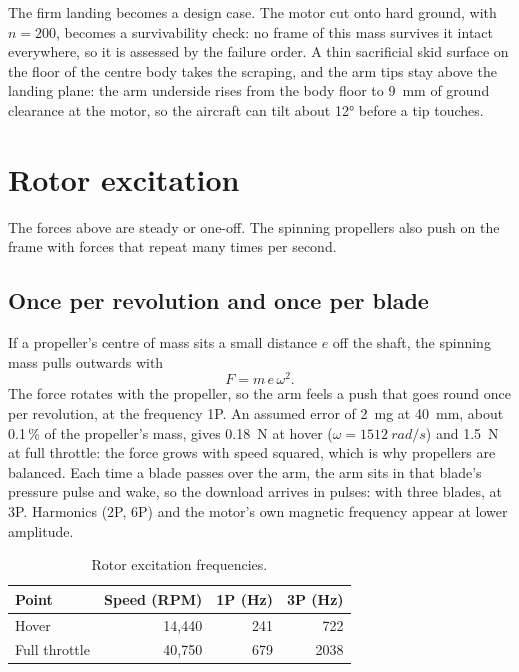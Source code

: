 The firm landing becomes a design case. The motor cut onto hard ground, with $n = 200$, becomes a survivability check: no frame of this mass survives it intact everywhere, so it is assessed by the failure order. A thin sacrificial skid surface on the floor of the centre body takes the scraping, and the arm tips stay above the landing plane: the arm underside rises from the body floor to \SI{9}{mm} of ground clearance at the motor, so the aircraft can tilt about \ang{12} before a tip touches.

\section{Rotor excitation}\label{sec:loads-vibration}

The forces above are steady or one-off. The spinning propellers also push on the frame with forces that repeat many times per second.

\subsection{Once per revolution and once per blade}

If a propeller's centre of mass sits a small distance $e$ off the shaft, the spinning mass pulls outwards with
\begin{equation}
F = m\,e\,\omega^2.
\end{equation}
The force rotates with the propeller, so the arm feels a push that goes round once per revolution, at the frequency 1P. An assumed error of \SI{2}{mg} at \SI{40}{mm}, about 0.1\,\% of the propeller's mass, gives \SI{0.18}{N} at hover ($\omega = \SI{1512}{rad/s}$) and \SI{1.5}{N} at full throttle: the force grows with speed squared, which is why propellers are balanced. Each time a blade passes over the arm, the arm sits in that blade's pressure pulse and wake, so the download arrives in pulses: with three blades, at 3P. Harmonics (2P, 6P) and the motor's own magnetic frequency appear at lower amplitude.

\begin{table}[htbp]
\centering\small
\caption{Rotor excitation frequencies.}\label{tab:loads-frequencies}
\begin{tabular}{@{}lrrr@{}}
\toprule
Point & Speed (RPM) & 1P (Hz) & 3P (Hz)\\
\midrule
Hover & 14,440 & 241 & 722\\
Full throttle & 40,750 & 679 & 2038\\
\bottomrule
\end{tabular}
\end{table}

